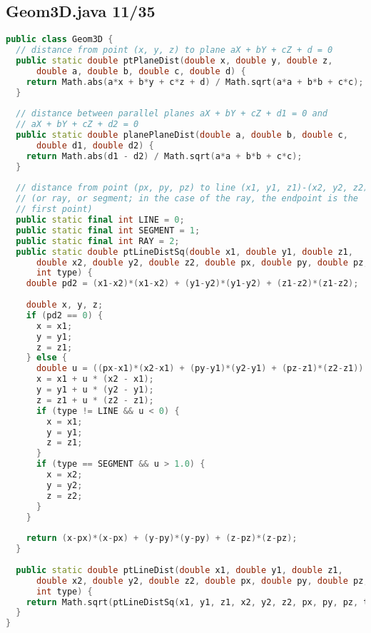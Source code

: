 \subsection{Geom3D.java 11/35}
\begin{lstlisting}[language=C++]
public class Geom3D {
  // distance from point (x, y, z) to plane aX + bY + cZ + d = 0
  public static double ptPlaneDist(double x, double y, double z,
      double a, double b, double c, double d) {
    return Math.abs(a*x + b*y + c*z + d) / Math.sqrt(a*a + b*b + c*c);
  }
  
  // distance between parallel planes aX + bY + cZ + d1 = 0 and
  // aX + bY + cZ + d2 = 0
  public static double planePlaneDist(double a, double b, double c,
      double d1, double d2) {
    return Math.abs(d1 - d2) / Math.sqrt(a*a + b*b + c*c);
  }
  
  // distance from point (px, py, pz) to line (x1, y1, z1)-(x2, y2, z2)
  // (or ray, or segment; in the case of the ray, the endpoint is the
  // first point)
  public static final int LINE = 0;
  public static final int SEGMENT = 1;
  public static final int RAY = 2;
  public static double ptLineDistSq(double x1, double y1, double z1,
      double x2, double y2, double z2, double px, double py, double pz,
      int type) {
    double pd2 = (x1-x2)*(x1-x2) + (y1-y2)*(y1-y2) + (z1-z2)*(z1-z2);
    
    double x, y, z;
    if (pd2 == 0) {
      x = x1;
      y = y1;
      z = z1;
    } else {
      double u = ((px-x1)*(x2-x1) + (py-y1)*(y2-y1) + (pz-z1)*(z2-z1)) / pd2;
      x = x1 + u * (x2 - x1);
      y = y1 + u * (y2 - y1);
      z = z1 + u * (z2 - z1);
      if (type != LINE && u < 0) {
        x = x1;
        y = y1;
        z = z1;
      }
      if (type == SEGMENT && u > 1.0) {
        x = x2;
        y = y2;
        z = z2;
      }
    }
    
    return (x-px)*(x-px) + (y-py)*(y-py) + (z-pz)*(z-pz);
  }
  
  public static double ptLineDist(double x1, double y1, double z1,
      double x2, double y2, double z2, double px, double py, double pz,
      int type) {
    return Math.sqrt(ptLineDistSq(x1, y1, z1, x2, y2, z2, px, py, pz, type));
  }
}

\end{lstlisting}
